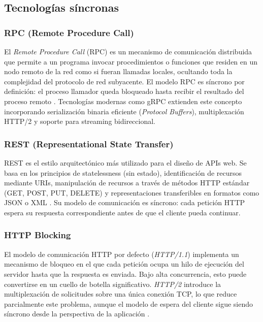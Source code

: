 \documentclass[12pt,a4paper]{article}
\begin{document}
\subsection{Tecnologías síncronas}
 
\subsubsection{RPC (Remote Procedure Call)}
 
El \textit{Remote Procedure Call} (RPC) es un mecanismo de comunicación distribuida que permite a un programa invocar procedimientos o funciones que residen en un nodo remoto de la red como si fueran llamadas locales, ocultando toda la complejidad del protocolo de red subyacente. El modelo RPC es síncrono por definición: el proceso llamador queda bloqueado hasta recibir el resultado del proceso remoto \cite{ref23}. Tecnologías modernas como gRPC extienden este concepto incorporando serialización binaria eficiente (\textit{Protocol Buffers}), multiplexación HTTP/2 y soporte para streaming bidireccional.
 
\subsubsection{REST (Representational State Transfer)}
 
REST es el estilo arquitectónico más utilizado para el diseño de APIs web. Se basa en los principios de statelessness (sin estado), identificación de recursos mediante URIs, manipulación de recursos a través de métodos HTTP estándar (GET, POST, PUT, DELETE) y representaciones transferibles en formatos como JSON o XML \cite{ref5}. Su modelo de comunicación es síncrono: cada petición HTTP espera su respuesta correspondiente antes de que el cliente pueda continuar.
 
\subsubsection{HTTP Blocking}
 
El modelo de comunicación HTTP por defecto (\textit{HTTP/1.1}) implementa un mecanismo de bloqueo en el que cada petición ocupa un hilo de ejecución del servidor hasta que la respuesta es enviada. Bajo alta concurrencia, esto puede convertirse en un cuello de botella significativo. \textit{HTTP/2} introduce la multiplexación de solicitudes sobre una única conexión TCP, lo que reduce parcialmente este problema, aunque el modelo de espera del cliente sigue siendo síncrono desde la perspectiva de la aplicación \cite{ref7}.
 
\end{document}
